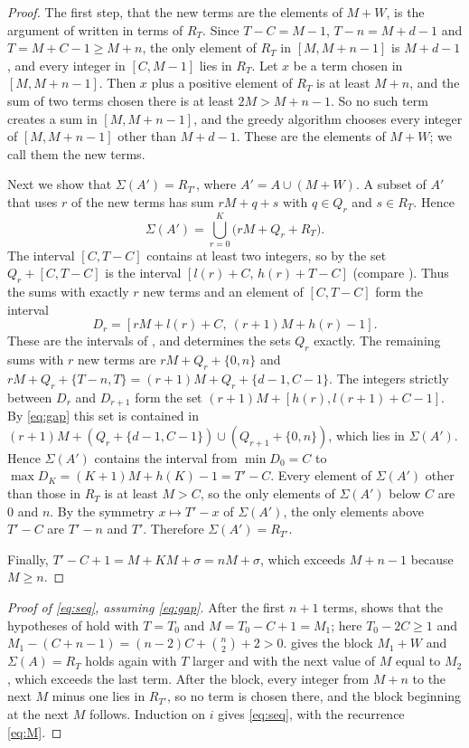 \documentclass[11pt]{article}
\theoremstyle{remark}
\begin{document}
\begin{proof}
The first step, that the new terms are the elements of $M+W$, is the argument of \cite[Section~3, p.~13]{FK}
written in terms of $R_T$.
Since $T-C=M-1$, $T-n=M+d-1$ and $T=M+C-1\ge M+n$, the only element of $R_T$ in $[M,M+n-1]$ is $M+d-1$, and every
integer in $[C,M-1]$ lies in $R_T$. Let $x$ be a term chosen in $[M,M+n-1]$. Then $x$ plus a positive element of $R_T$ is
at least $M+n$, and the sum of two terms chosen there is at least $2M>M+n-1$. So no such term creates a sum in
$[M,M+n-1]$, and the greedy algorithm chooses every integer of $[M,M+n-1]$ other than $M+d-1$. These are the elements
of $M+W$; we call them the new terms.

Next we show that $\Sigma(A')=R_{T'}$, where $A'=A\cup(M+W)$. A subset of $A'$ that uses $r$ of the new terms has sum
$rM+q+s$ with $q\in Q_r$ and $s\in R_T$. Hence
\[
\Sigma(A')=\bigcup_{r=0}^{K}\bigl(rM+Q_r+R_T\bigr).
\]
The interval $[C,T-C]$ contains at least two integers, so by  the set $Q_r+[C,T-C]$ is the interval
$[l(r)+C,\,h(r)+T-C]$ (compare \cite[Lemma~3]{FK}). Thus the sums with exactly $r$ new terms and an element of $[C,T-C]$ form the interval
\[
D_r=[rM+l(r)+C,\ (r+1)M+h(r)-1].
\]
These are the intervals of \cite[Section~3]{FK}, and \cite[Lemma~2]{FK} determines the sets $Q_r$ exactly. The remaining sums with $r$ new terms are $rM+Q_r+\{0,n\}$ and
$rM+Q_r+\{T-n,T\}=(r+1)M+Q_r+\{d-1,C-1\}$. The integers strictly between $D_r$ and $D_{r+1}$ form the set
$(r+1)M+[h(r),l(r+1)+C-1]$. By \eqref{eq:gap} this set is contained in
$(r+1)M+(Q_r+\{d-1,C-1\})\cup(Q_{r+1}+\{0,n\})$, which lies in $\Sigma(A')$. Hence $\Sigma(A')$ contains the
interval from $\min D_0=C$ to $\max D_K=(K+1)M+h(K)-1=T'-C$. Every element of $\Sigma(A')$ other than those in
$R_T$ is at least $M>C$, so the only elements of $\Sigma(A')$ below $C$ are $0$ and $n$. By the symmetry
$x\mapsto T'-x$ of $\Sigma(A')$, the only elements above $T'-C$ are $T'-n$ and $T'$. Therefore
$\Sigma(A')=R_{T'}$.

Finally, $T'-C+1=M+KM+\sigma=nM+\sigma$, which exceeds $M+n-1$ because $M\ge n$.
\end{proof}

\begin{proof}[Proof of \eqref{eq:seq}, assuming \eqref{eq:gap}]
After the first $n+1$ terms,  shows that the hypotheses of  hold with
$T=T_0$ and $M=T_0-C+1=M_1$; here $T_0-2C\ge 1$ and $M_1-(C+n-1)=(n-2)C+\binom n2+2>0$.  gives the block $M_1+W$
and $\Sigma(A)=R_T$ holds again with $T$ larger and with the next value of $M$ equal to $M_2$, which exceeds the last
term. After the block, every integer from $M+n$ to the next $M$ minus one lies in $R_{T'}$, so no term is chosen
there, and the block beginning at the next $M$ follows. Induction on $i$ gives \eqref{eq:seq}, with the recurrence
\eqref{eq:M}.
\end{proof}
\end{document}
